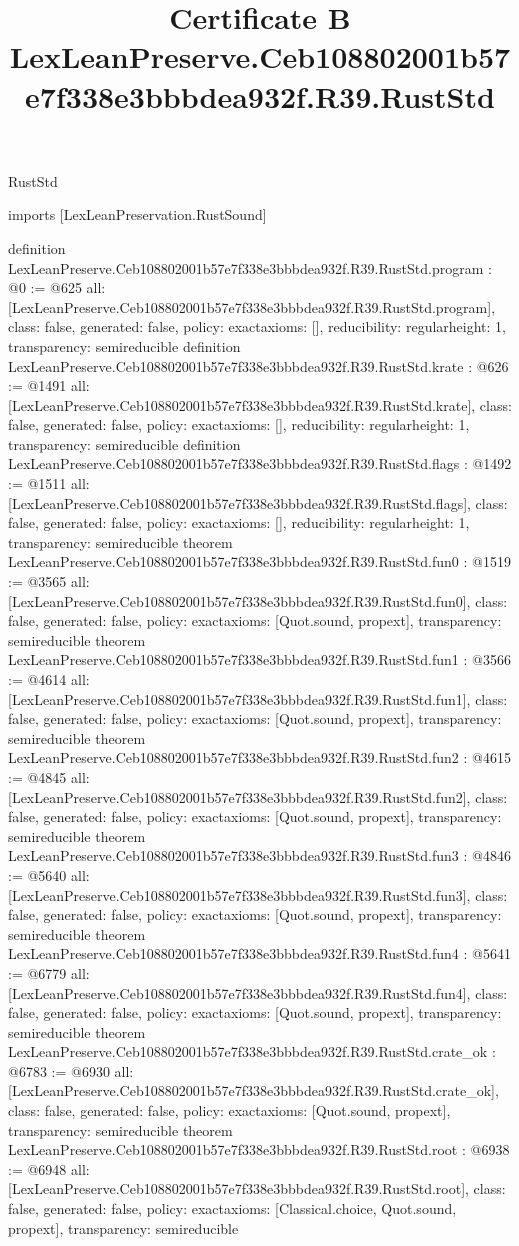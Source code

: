 \begin{lexlean}{RustStd}
\title{Certificate B LexLeanPreserve.Ceb108802001b57e7f338e3bbbdea932f.R39.RustStd}
\begin{coremodule}
imports [LexLeanPreservation.RustSound]

definition LexLeanPreserve.Ceb108802001b57e7f338e3bbbdea932f.R39.RustStd.program : @0 := @625 {
  all: [LexLeanPreserve.Ceb108802001b57e7f338e3bbbdea932f.R39.RustStd.program],
  class: false,
  generated: false,
  policy: exact{axioms: []},
  reducibility: regular{height: 1},
  transparency: semireducible
}
definition LexLeanPreserve.Ceb108802001b57e7f338e3bbbdea932f.R39.RustStd.krate : @626 := @1491 {
  all: [LexLeanPreserve.Ceb108802001b57e7f338e3bbbdea932f.R39.RustStd.krate],
  class: false,
  generated: false,
  policy: exact{axioms: []},
  reducibility: regular{height: 1},
  transparency: semireducible
}
definition LexLeanPreserve.Ceb108802001b57e7f338e3bbbdea932f.R39.RustStd.flags : @1492 := @1511 {
  all: [LexLeanPreserve.Ceb108802001b57e7f338e3bbbdea932f.R39.RustStd.flags],
  class: false,
  generated: false,
  policy: exact{axioms: []},
  reducibility: regular{height: 1},
  transparency: semireducible
}
theorem LexLeanPreserve.Ceb108802001b57e7f338e3bbbdea932f.R39.RustStd.fun0 : @1519 := @3565 {
  all: [LexLeanPreserve.Ceb108802001b57e7f338e3bbbdea932f.R39.RustStd.fun0],
  class: false,
  generated: false,
  policy: exact{axioms: [Quot.sound, propext]},
  transparency: semireducible
}
theorem LexLeanPreserve.Ceb108802001b57e7f338e3bbbdea932f.R39.RustStd.fun1 : @3566 := @4614 {
  all: [LexLeanPreserve.Ceb108802001b57e7f338e3bbbdea932f.R39.RustStd.fun1],
  class: false,
  generated: false,
  policy: exact{axioms: [Quot.sound, propext]},
  transparency: semireducible
}
theorem LexLeanPreserve.Ceb108802001b57e7f338e3bbbdea932f.R39.RustStd.fun2 : @4615 := @4845 {
  all: [LexLeanPreserve.Ceb108802001b57e7f338e3bbbdea932f.R39.RustStd.fun2],
  class: false,
  generated: false,
  policy: exact{axioms: [Quot.sound, propext]},
  transparency: semireducible
}
theorem LexLeanPreserve.Ceb108802001b57e7f338e3bbbdea932f.R39.RustStd.fun3 : @4846 := @5640 {
  all: [LexLeanPreserve.Ceb108802001b57e7f338e3bbbdea932f.R39.RustStd.fun3],
  class: false,
  generated: false,
  policy: exact{axioms: [Quot.sound, propext]},
  transparency: semireducible
}
theorem LexLeanPreserve.Ceb108802001b57e7f338e3bbbdea932f.R39.RustStd.fun4 : @5641 := @6779 {
  all: [LexLeanPreserve.Ceb108802001b57e7f338e3bbbdea932f.R39.RustStd.fun4],
  class: false,
  generated: false,
  policy: exact{axioms: [Quot.sound, propext]},
  transparency: semireducible
}
theorem LexLeanPreserve.Ceb108802001b57e7f338e3bbbdea932f.R39.RustStd.crate_ok : @6783 := @6930 {
  all: [LexLeanPreserve.Ceb108802001b57e7f338e3bbbdea932f.R39.RustStd.crate_ok],
  class: false,
  generated: false,
  policy: exact{axioms: [Quot.sound, propext]},
  transparency: semireducible
}
theorem LexLeanPreserve.Ceb108802001b57e7f338e3bbbdea932f.R39.RustStd.root : @6938 := @6948 {
  all: [LexLeanPreserve.Ceb108802001b57e7f338e3bbbdea932f.R39.RustStd.root],
  class: false,
  generated: false,
  policy: exact{axioms: [Classical.choice, Quot.sound, propext]},
  transparency: semireducible
}


\end{coremodule}
\end{lexlean}
